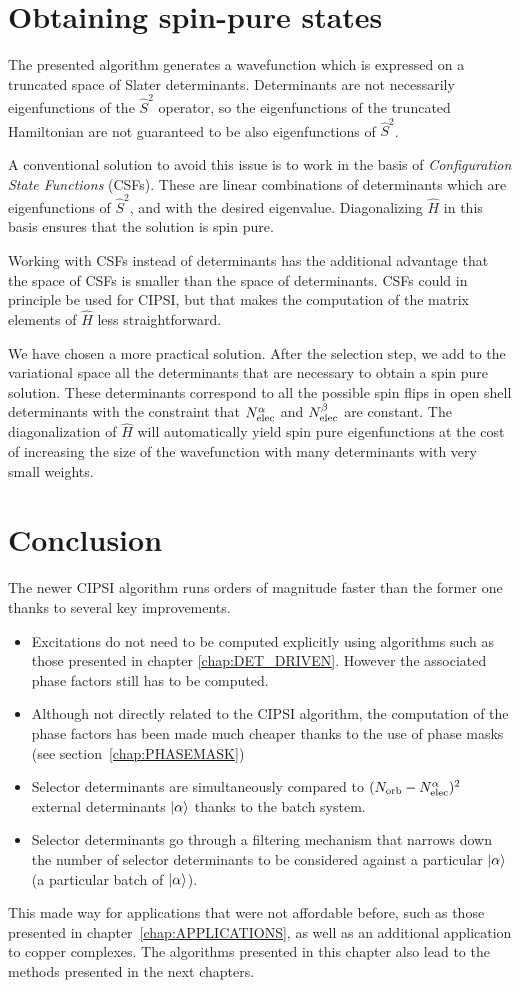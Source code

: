 \documentclass[./thesis.tex]{subfiles}
\begin{document}
\section{Obtaining spin-pure states}
\label{sec:cipsi_s2}

The presented algorithm generates a wavefunction which is expressed on a truncated space of Slater determinants. Determinants are not necessarily eigenfunctions of the $\widehat S^2$ operator, so the eigenfunctions of the truncated Hamiltonian are not guaranteed to be also eigenfunctions of $\widehat S^2$.

A conventional solution to avoid this issue is to work in the basis of \emph{Configuration State Functions} (CSFs). These are linear combinations of determinants which are eigenfunctions of $\widehat S^2$, and with the desired eigenvalue. Diagonalizing $\widehat H$ in this basis ensures that the solution is spin pure.

Working with CSFs instead of determinants has the additional advantage that the space of CSFs is smaller than the space of determinants. CSFs could in principle be used for CIPSI, but that makes the computation of the matrix elements of $\widehat H$ less straightforward.

We have chosen a more practical solution.\cite{Bytautas_2009} After the selection step, we add to the variational space all the determinants that are necessary to obtain a spin pure solution. These determinants correspond to all the possible spin flips in open shell determinants with the constraint that ${N_\text{elec}^\alpha}$ and ${N_\text{elec}^\beta}$ are constant. The diagonalization of $\widehat H$ will automatically yield spin pure eigenfunctions at the cost of increasing the size of the wavefunction with many determinants with very small weights.

\section{Conclusion}

The newer CIPSI algorithm runs orders of magnitude faster than the former one thanks to several key improvements.
\begin{itemize}
\item
Excitations do not need to be computed explicitly using algorithms such as those presented in chapter \ref{chap:DET_DRIVEN}. However the associated phase factors still has to be computed.
\item
Although not directly related to the CIPSI algorithm, the computation of the phase factors has been made much cheaper thanks to the use of phase masks (see section~\ref{chap:PHASEMASK})
\item
Selector determinants are simultaneously compared to $({N_\text{orb}}-{N_\text{elec}^\alpha})^2$ external determinants ${\ket{\alpha}}$ thanks to the batch system.
\item
Selector determinants go through a filtering mechanism that narrows down the number of selector determinants to be considered against a particular ${\ket{\alpha}}$ (a particular batch of ${\ket{\alpha}}$).
\end{itemize}

This made way for applications that were not affordable before, such as those presented in chapter~\ref{chap:APPLICATIONS}, as well as an additional application to copper complexes.\cite{1806.05115}
The algorithms presented in this chapter also lead to the methods presented in the next chapters.
\end{document}
